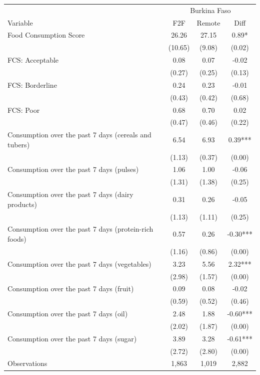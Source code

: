 \begin{tabular}{l*{3}c}
\hline\hline
 & \multicolumn{3}{c}{Burkina Faso}\\ 
Variable & F2F & Remote & Diff \\
\hline
Food Consumption Score&26.26&27.15&0.89*\\
&(10.65)&(9.08)&(0.02)\\
FCS: Acceptable&0.08&0.07&-0.02\\
&(0.27)&(0.25)&(0.13)\\
FCS: Borderline&0.24&0.23&-0.01\\
&(0.43)&(0.42)&(0.68)\\
FCS: Poor&0.68&0.70&0.02\\
&(0.47)&(0.46)&(0.22)\\
Consumption over the past 7 days (cereals and tubers)&6.54&6.93&0.39***\\
&(1.13)&(0.37)&(0.00)\\
Consumption over the past 7 days (pulses)&1.06&1.00&-0.06\\
&(1.31)&(1.38)&(0.25)\\
Consumption over the past 7 days (dairy products)&0.31&0.26&-0.05\\
&(1.13)&(1.11)&(0.25)\\
Consumption over the past 7 days (protein-rich foods)&0.57&0.26&-0.30***\\
&(1.16)&(0.86)&(0.00)\\
Consumption over the past 7 days (vegetables)&3.23&5.56&2.32***\\
&(2.98)&(1.57)&(0.00)\\
Consumption over the past 7 days (fruit)&0.09&0.08&-0.02\\
&(0.59)&(0.52)&(0.46)\\
Consumption over the past 7 days (oil)&2.48&1.88&-0.60***\\
&(2.02)&(1.87)&(0.00)\\
Consumption over the past 7 days (sugar)&3.89&3.28&-0.61***\\
&(2.72)&(2.80)&(0.00)\\
\hline
Observations & 1,863 & 1,019 & 2,882 \\
\hline\hline
\end{tabular}
